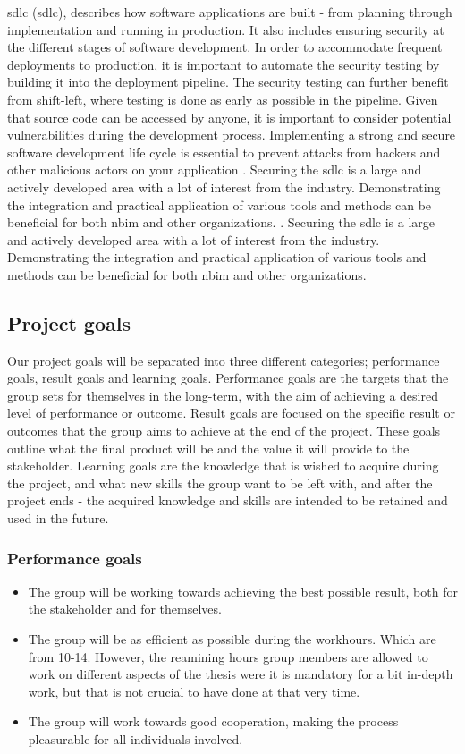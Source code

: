 \acrlong{sdlc} (\acrshort{sdlc}), describes how software applications are built - from planning through implementation and running in production. It also includes ensuring security at the different stages of software development. In order to accommodate frequent deployments to production, it is important to automate the security testing by building it into the deployment pipeline. The security testing can further benefit from shift-left, where testing is done as early as possible in the pipeline. Given that source code can be accessed by anyone, it is important to consider potential vulnerabilities during the development process. Implementing a strong and secure software development life cycle is essential to prevent attacks from hackers and other malicious actors on your application 
\cite{sdlc}. Securing the \acrshort{sdlc} is a large and actively developed area with a lot of interest from the industry. Demonstrating the integration and practical application of various tools and methods can be beneficial for both \acrshort{nbim} and other organizations.
\cite{sdlc}. Securing the \acrshort{sdlc} is a large and actively developed area with a lot of interest from the industry. Demonstrating the integration and practical application of various tools and methods can be beneficial for both \acrshort{nbim} and other organizations.


\subsection{Project goals}
Our project goals will be separated into three different categories; performance goals, result goals and learning goals. Performance goals are the targets that the group sets for themselves in the long-term, with the aim of achieving a desired level of performance or outcome. Result goals are focused on the specific result or outcomes that the group aims to achieve at the end of the project. These goals outline what the final product will be and the value it will provide to the stakeholder. Learning goals are the knowledge that is wished to acquire during the project, and what new skills the group want to be left with, and after the project ends - the acquired knowledge and skills are intended to be retained and used in the future. 

\subsubsection{Performance goals}
\begin{itemize}
    \item  The group will be working towards achieving the best possible result, both for the stakeholder and for themselves.
    \item The group will be as efficient as possible during the workhours. Which are from 10-14. However, the reamining hours group members are allowed to work on different aspects of the thesis were it is mandatory for a bit in-depth work, but that is not crucial to have done at that very time. 
    \item The group will work towards good cooperation, making the process pleasurable for all individuals involved.
\end{itemize}


